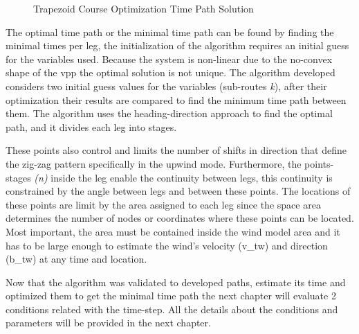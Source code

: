 \begin{figure} [hbt!]
  \centering
  \hfill

  \caption{Trapezoid Course Optimization Time Path Solution} %
\label{fig:Val_algorithm_Route}
\end{figure}

The optimal time path or the minimal time path can be found by finding the minimal times per leg, the initialization of the algorithm requires an initial guess for the variables used. Because the system is non-linear due to the no-convex shape of the \acrshort{vpp} the optimal solution is not unique. The algorithm developed considers two initial guess values for the variables (sub-routes \textit{k}), after their optimization their results are compared to find the minimum time path between them.  
The algorithm uses the heading-direction approach to find the optimal path, and it divides each leg into stages. \par 
\noindent
These points also control and limits the number of shifts in direction that define the zig-zag pattern specifically in the upwind mode. %
Furthermore, the points-stages \textit{(n)} inside the leg enable the continuity between legs, this continuity is constrained by the angle between legs and between these points. The locations of these points are limit by the area assigned to each leg since the space area determines the number of nodes or coordinates where these points can be located. Most important, the area must be contained inside the wind model area and it has to be large enough to estimate the wind's velocity (\acrshort{v_tw}) and direction (\acrshort{b_tw}) at any time and location.
\par Now that the algorithm was validated to developed paths, estimate its time and optimized them to get the minimal time path the next chapter will evaluate 2 conditions related with the time-step. All the details about the conditions and parameters will be provided in the next chapter.





